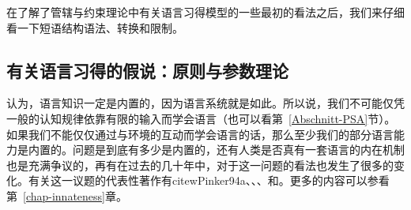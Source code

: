 在了解了管辖与约束理论中有关语言习得模型的一些最初的看法之后，我们来仔细看一下短语结构语法、转换和限制。

\subsection{有关语言习得的假说：原则与参数理论}
\label{Abschnitt-GB-Paramater}

\citet[Section~I.8]{Chomsky65a}认为，语言知识一定是内置的，因为语言系统就是如此。所以说，我们不可能仅凭一般的认知规律依靠有限的输入而学会语言（也可以看第~\ref{Abschnitt-PSA}节）。如果我们不能仅仅通过与环境的互动而学会语言的话，那么至少我们的部分语言能力是内置的。问题是到底有多少是内置的，还有人类是否真有一套语言的内在机制也是充满争议的，再有在过去的几十年中，对于这一问题的看法也发生了很多的变化。有关这一议题的代表性著作有citew{Pinker94a}、、、和。更多的内容可以参看第~\ref{chap-innateness}章。

